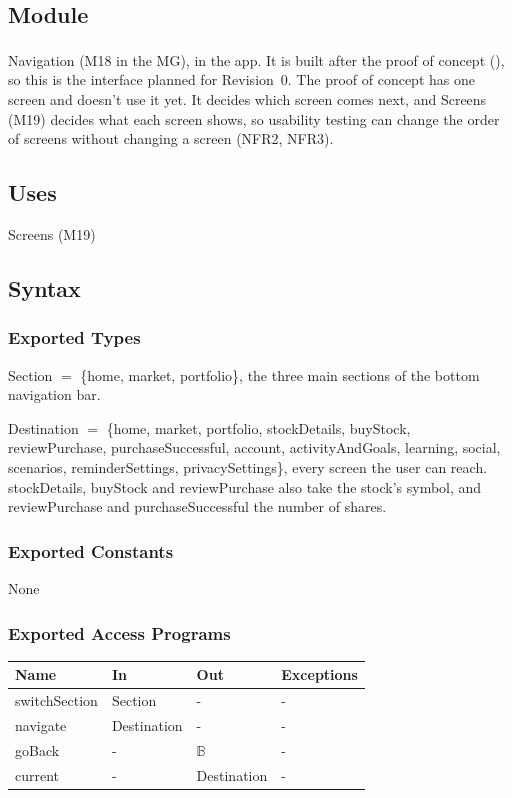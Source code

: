 \documentclass[12pt, titlepage]{article}
\begin{document}
\begingroup\raggedright
\subsection{Module}

Navigation (M18 in the MG), in the app. It is built after the proof of
concept (\textsuperscript{\dag}), so this is the interface planned for
Revision~0. The proof of concept has one screen and doesn't use it yet. It
decides which screen comes next, and Screens (M19) decides what each screen
shows, so usability testing can change the order of screens without changing
a screen (NFR2, NFR3).

\subsection{Uses}

Screens (M19)

\subsection{Syntax}

\subsubsection{Exported Types}

\noindent Section $=$ \{home, market, portfolio\}, the three main sections of
the bottom navigation bar.

\medskip
\noindent Destination $=$ \{home, market, portfolio, stockDetails, buyStock,
reviewPurchase, purchaseSuccessful, account, activityAndGoals, learning,
social, scenarios, reminderSettings, privacySettings\}, every screen the user
can reach. stockDetails, buyStock and reviewPurchase also take the stock's
symbol, and reviewPurchase and purchaseSuccessful the number of shares.

\subsubsection{Exported Constants}

None

\subsubsection{Exported Access Programs}

\begin{center}
\small
\setlength{\tabcolsep}{3pt}
\begin{tabular}{>{\raggedright\arraybackslash}p{3.9cm}
  >{\raggedright\arraybackslash}p{3.7cm}
  >{\raggedright\arraybackslash}p{3.4cm}
  >{\raggedright\arraybackslash}p{4.3cm}}
\toprule
\textbf{Name} & \textbf{In} & \textbf{Out} & \textbf{Exceptions} \\
\midrule
switchSection & Section & - & - \\
navigate & Destination & - & - \\
goBack & - & $\mathbb{B}$ & - \\
current & - & Destination & - \\
\bottomrule
\end{tabular}
\end{center}
\end{document}
